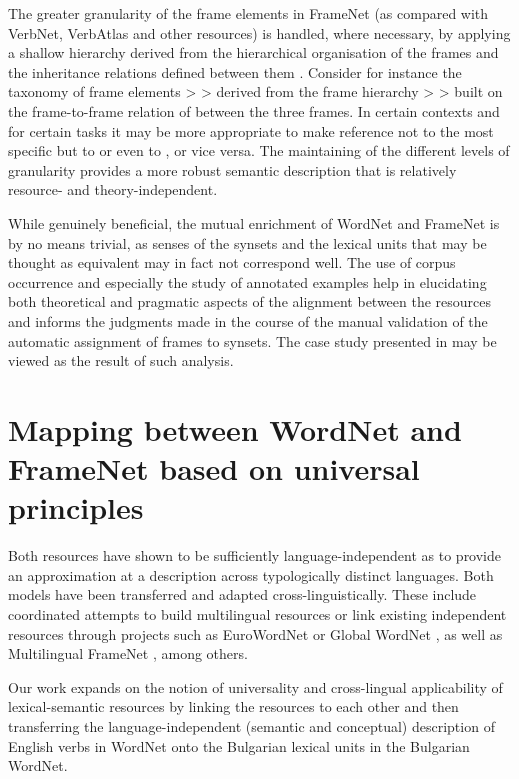 \documentclass[output=paper,colorlinks,citecolor=brown]{langscibook}
\begin{document}
The greater granularity of the frame elements in FrameNet (as compared with VerbNet, VerbAtlas and other resources) is handled, where necessary, by applying a shallow hierarchy derived from the hierarchical organisation of the frames and the inheritance relations defined between them \citep{Litkowski-2014-framenet}. %
Consider for instance the taxonomy of frame elements  >  >  derived from the frame hierarchy  >  >  built on the frame-to-frame relation of  between the three frames. In certain contexts and for certain tasks it may be more appropriate to make reference not to the most specific  but to  or even to , or vice versa. The maintaining of the different levels of granularity provides a more robust semantic description that is relatively resource- and theory-independent.

While genuinely beneficial, the mutual enrichment of WordNet and FrameNet is by no means trivial, as senses of the synsets and the lexical units that may be thought as equivalent may in fact not correspond well. The use of corpus occurrence and especially the study of annotated examples help in elucidating both theoretical and pragmatic aspects of the alignment between the resources and informs the judgments made in the course of the manual validation of the automatic assignment of frames to synsets. The case study presented in  may be viewed as the result of such analysis.

\section{Mapping between WordNet and FrameNet based on universal principles}\label{sec:mappings} 

Both resources have shown to be sufficiently language-independent as to provide an approximation at a description across typologically distinct languages. Both models have been transferred and adapted cross-linguistically. These include coordinated attempts to build multilingual resources or link existing independent resources through projects such as EuroWordNet \citep{Vossen2004} or Global WordNet \citep{mccrae-etal-2021-globalwordnet}, as well as Multilingual FrameNet \citep{Gilardi2018LearningTA}, among others. 

Our work expands on the notion of universality and cross-lingual applicability of lexical-semantic resources by linking the resources to each other and then transferring the language-independent (semantic and conceptual) description of English verbs in WordNet onto the Bulgarian lexical units in the Bulgarian WordNet.
\end{document}
